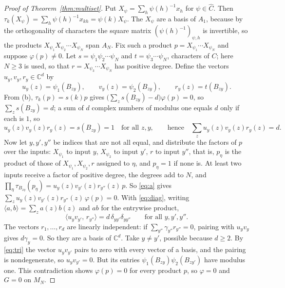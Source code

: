 \begin{proof}[Proof of Theorem~\ref{thm:multiset}]
Put $X_\psi=\sum_h\psi(h)^{-1}x_h$ for $\psi\in\hat C$. Then $\tau_k(X_\psi)=\sum_h\psi(h)^{-1}x_{kh}=\psi(k)X_\psi$. The $X_\psi$ are a basis of $A_1$, because by the orthogonality of characters the square matrix $(\psi(h)^{-1})_{\psi,h}$ is invertible, so the products $X_{\psi_1}X_{\psi_2}\cdots X_{\psi_N}$ span $A_N$. Fix such a product $p=X_{\psi_1}\cdots X_{\psi_N}$ and suppose $\varphi(p)\ne0$. Let $s=\psi_1\psi_2\cdots\psi_N$ and $t=\psi_3\cdots\psi_N$, characters of $C$; here $N\ge3$ is used, so that $r=X_{\psi_3}\cdots X_{\psi_N}$ has positive degree. Define the vectors $u_y,v_y,r_y\in\mathbb{C}^d$ by
\[
u_y(z)=\psi_1(B_{zy}),\qquad v_y(z)=\psi_2(B_{zy}),\qquad r_y(z)=t(B_{zy}).
\]
From (b), $\tau_k(p)=s(k)p$ gives $\bigl(\sum_zs(B_{zy})-d\bigr)\varphi(p)=0$, so $\sum_zs(B_{zy})=d$; a sum of $d$ complex numbers of modulus one equals $d$ only if each is $1$, so
\begin{equation}\label{eq:diag}
u_y(z)v_y(z)r_y(z)=s(B_{zy})=1\quad\text{for all }z,y,\qquad\text{hence}\quad\sum_zu_y(z)v_y(z)r_y(z)=d .
\end{equation}
Now let $y,y',y''$ be indices that are not all equal, and distribute the factors of $p$ over the inputs: $X_{\psi_1}$ to input $y$, $X_{\psi_2}$ to input $y'$, $r$ to input $y''$, that is, $p_{\eta}$ is the product of those of $X_{\psi_1},X_{\psi_2},r$ assigned to $\eta$, and $p_\eta=1$ if none is. At least two inputs receive a factor of positive degree, the degrees add to $N$, and $\prod_\eta\tau_{B_{z\eta}}(p_\eta)=u_y(z)v_{y'}(z)r_{y''}(z)\,p$. So \eqref{eq:a} gives $\sum_zu_y(z)v_{y'}(z)r_{y''}(z)\,\varphi(p)=0$. With \eqref{eq:diag}, writing $\langle a,b\rangle=\sum_za(z)b(z)$ and $ab$ for the entrywise product,
\begin{equation}\label{eq:tri}
\langle u_yv_{y'},\,r_{y''}\rangle=d\,\delta_{yy'}\delta_{yy''}\qquad\text{for all }y,y',y''.
\end{equation}
The vectors $r_1,\dots,r_d$ are linearly independent: if $\sum_{y''}\gamma_{y''}r_{y''}=0$, pairing with $u_yv_y$ gives $d\gamma_y=0$. So they are a basis of $\mathbb{C}^d$. Take $y\ne y'$, possible because $d\ge2$. By \eqref{eq:tri} the vector $u_yv_{y'}$ pairs to zero with every vector of a basis, and the pairing is nondegenerate, so $u_yv_{y'}=0$. But its entries $\psi_1(B_{zy})\psi_2(B_{zy'})$ have modulus one. This contradiction shows $\varphi(p)=0$ for every product $p$, so $\varphi=0$ and $G=0$ on $M_N$.


\end{proof}
